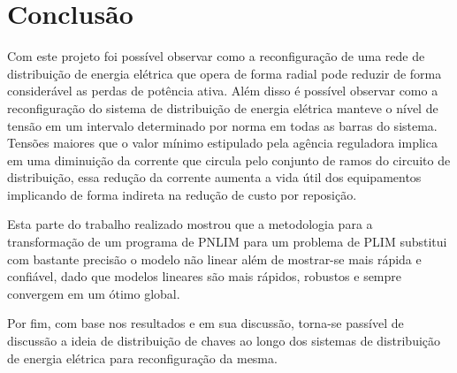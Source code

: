 \section{Conclusão}

Com este projeto foi possível observar como a reconfiguração de uma rede de distribuição de energia elétrica que opera de forma radial pode reduzir de forma considerável as perdas de potência ativa.
Além disso é possível observar como a reconfiguração do sistema de distribuição de energia elétrica manteve o nível de tensão em um intervalo determinado por norma em todas as barras do sistema.
Tensões maiores que o valor mínimo estipulado pela agência reguladora implica em uma diminuição da corrente que circula pelo conjunto de ramos do circuito de distribuição, essa redução da corrente aumenta a vida útil dos equipamentos implicando de forma indireta na redução de custo por reposição.

Esta parte do trabalho realizado mostrou que a metodologia para a transformação de um programa de PNLIM para um problema de PLIM substitui com bastante precisão o modelo não linear além de mostrar-se mais rápida e confiável, dado que modelos lineares são mais rápidos, robustos e sempre convergem em um ótimo global.

Por fim, com base nos resultados e em sua discussão, torna-se passível de discussão a ideia de distribuição de chaves ao longo dos sistemas de distribuição de energia elétrica para reconfiguração da mesma.